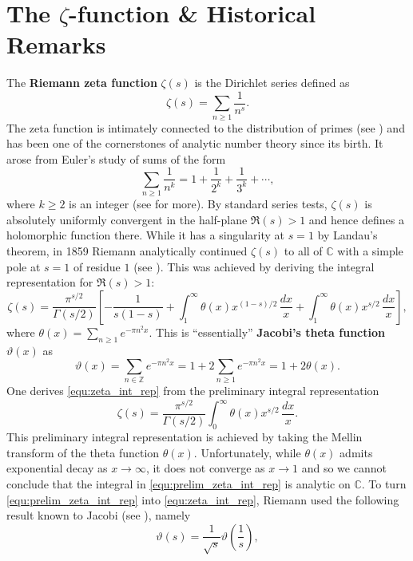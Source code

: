 \documentclass[12pt,reqno]{amsart}
\theoremstyle{definition}
\numberwithin{equation}{section}
\newcommand{\C}{{\mathbb C}}
\begin{document}
\section{The \texorpdfstring{$\zeta$}{z}-function \& Historical Remarks}
    The \textbf{Riemann zeta function} $\zeta(s)$ is the Dirichlet series defined as
    \[
        \zeta(s) = \sum_{n \ge 1}\frac{1}{n^{s}}.
    \]
    The zeta function is intimately connected to the distribution of primes (see \cite{H,P}) and has been one of the cornerstones of analytic number theory since its birth. It arose from Euler's study of sums of the form
    \[
        \sum_{n \ge 1}\frac{1}{n^{k}} = 1+\frac{1}{2^{k}}+\frac{1}{3^{k}}+\cdots,
    \]
    where $k \ge 2$ is an integer (see \cite{E} for more). By standard series tests, $\zeta(s)$ is absolutely uniformly convergent in the half-plane $\Re(s) > 1$ and hence defines a holomorphic function there. While it has a singularity at $s = 1$ by Landau's theorem, in 1859 Riemann analytically continued $\zeta(s)$ to all of $\C$ with a simple pole at $s = 1$ of residue $1$ (see \cite{R}). This was achieved by deriving the integral representation for $\Re(s) > 1$:
    \begin{equation}\label{equ:zeta_int_rep}
        \zeta(s) = \frac{\pi^{s/2}}{\Gamma\left(s/2\right)}\left[-\frac{1}{s(1-s)}+\int_{1}^{\infty}\theta(x)x^{(1-s)/2}\,\frac{dx}{x}+\int_{1}^{\infty}\theta(x)x^{s/2}\,\frac{dx}{x}\right],
    \end{equation}
    where $\theta(x) = \sum_{n \ge 1}e^{-\pi n^{2}x}$. This is ``essentially'' \textbf{Jacobi's theta function} $\vartheta(x)$ as
    \[
        \vartheta(x) = \sum_{n \in \mathbb{Z}}e^{-\pi n^{2}x} = 1+2\sum_{n \ge 1}e^{-\pi n^{2}x} = 1+2\theta(x).
    \]
    One derives \ref{equ:zeta_int_rep} from the preliminary integral representation
    \begin{equation}\label{equ:prelim_zeta_int_rep}
        \zeta(s) = \frac{\pi^{s/2}}{\Gamma\left(s/2\right)}\int_{0}^{\infty}\theta(x)x^{s/2}\,\frac{dx}{x}.
    \end{equation}
    This preliminary integral representation is achieved by taking the Mellin transform of the theta function $\theta(x)$. Unfortunately, while $\theta(x)$ admits exponential decay as $x \to \infty$, it does not converge as $x \to 1$ and so we cannot conclude that the integral in \ref{equ:prelim_zeta_int_rep} is analytic on $\C$. To turn \ref{equ:prelim_zeta_int_rep} into \ref{equ:zeta_int_rep}, Riemann used the following result known to Jacobi (see \cite{R}), namely
    \[
        \vartheta(s) = \frac{1}{\sqrt{s}}\vartheta\left(\frac{1}{s}\right),
    \]
\end{document}
